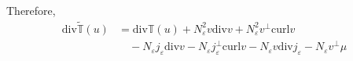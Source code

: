 \documentclass[a4paper]{article}
\renewcommand{\div}{\mathrm{div}}
\newcommand{\curl}{\mathrm{curl}}
\begin{document}
Therefore,
\begin{align}
  \div \tilde{\mathbb{T}}(u) &= \div \mathbb{T}(u) + N_\varepsilon^2 v \div v + N_\varepsilon^2 v^\perp \curl v \nonumber \\
  &\quad - N_\varepsilon j_\varepsilon \div v - N_\varepsilon j_\varepsilon^\perp \curl v - N_\varepsilon v \div j_\varepsilon - N_\varepsilon v^\perp \mu
  \label{eqn:simp_div_mod_stress_energy}
\end{align}
\end{document}
